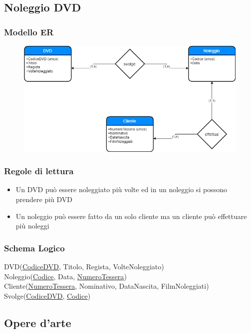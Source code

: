 \documentclass{article}
\begin{document}
	\pagebreak
	
	\subsection{Noleggio DVD}
	\subsubsection{Modello ER}
	\begin{figure}[h!]
		\centering
		\includegraphics[scale=0.5]{images/NoleggioDVD.png}
	\end{figure}
	\subsubsection{Regole di lettura}
	\begin{itemize}
		\item Un DVD può essere noleggiato più volte ed in un noleggio si possono prendere più DVD
		\item Un noleggio può essere fatto da un solo cliente ma un cliente può effettuare più noleggi
	\end{itemize}
	\subsubsection{Schema Logico}
	DVD(\underline{CodiceDVD}, Titolo, Regista, VolteNoleggiato)\\
	Noleggio(\underline{Codice}, Data, \underline{NumeroTessera})\\
	Cliente(\underline{NumeroTessera}, Nominativo, DataNascita, FilmNoleggiati)\\
	Svolge(\underline{CodiceDVD}, \underline{Codice})

	\pagebreak
	
	\subsection{Opere d'arte}
\end{document}

